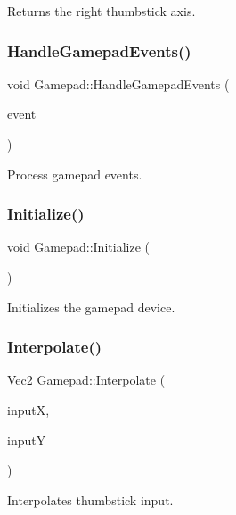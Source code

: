 Returns the right thumbstick axis. \mbox{\label{class_gamepad_a864978b3a8913f60ac17addb092e07be}} 
\subsubsection{\texorpdfstring{Handle\+Gamepad\+Events()}{HandleGamepadEvents()}}
{\footnotesize\ttfamily void Gamepad\+::\+Handle\+Gamepad\+Events (\begin{DoxyParamCaption}\item[{S\+D\+L\+\_\+\+Event}]{event }\end{DoxyParamCaption})}

Process gamepad events. \mbox{\label{class_gamepad_a265afcd224a5f19b76b70c4a27b43cf3}} 
\subsubsection{\texorpdfstring{Initialize()}{Initialize()}}
{\footnotesize\ttfamily void Gamepad\+::\+Initialize (\begin{DoxyParamCaption}{ }\end{DoxyParamCaption})}

Initializes the gamepad device. \mbox{\label{class_gamepad_a60cd7249f68b8898173f3182d1570563}} 
\subsubsection{\texorpdfstring{Interpolate()}{Interpolate()}}
{\footnotesize\ttfamily \mbox{\hyperlink{struct_vec2}{Vec2}} Gamepad\+::\+Interpolate (\begin{DoxyParamCaption}\item[{float}]{inputX,  }\item[{float}]{inputY }\end{DoxyParamCaption})}

Interpolates thumbstick input. \mbox{\label{class_gamepad_a247cbc78f48a4a87c95c5f4909b466c7}} 
